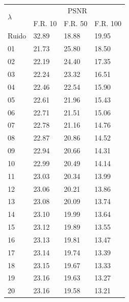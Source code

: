 \documentclass[a4paper]{article}
\begin{document}
\vspace{2em}
\centering 
\begin{tabular}{|l|l|l|l|}
  \hline
  \multirow{2}{*}{$\lambda$} & \multicolumn{3}{|c|}{PSNR} \\
  \cline{2-4}
   & F.R. 10 & F.R. 50 & F.R. 100 \\ \hline

  Ruido	 & 	32.89	 & 	18.88	 & 	19.95 \\
  01	 & 	21.73	 & 	25.80	 & 	18.50 \\
  02	 & 	22.19	 & 	24.40	 & 	17.35 \\
  03	 & 	22.24	 & 	23.32	 & 	16.51 \\
  04	 & 	22.46	 & 	22.54	 & 	15.90 \\
  05	 & 	22.61	 & 	21.96	 & 	15.43 \\
  06	 & 	22.71	 & 	21.51	 & 	15.06 \\
  07	 & 	22.78	 & 	21.16	 & 	14.76 \\
  08	 & 	22.87	 & 	20.86	 & 	14.52 \\
  09	 & 	22.94	 & 	20.66	 & 	14.31 \\
  10	 & 	22.99	 & 	20.49	 & 	14.14 \\
  11	 & 	23.03	 & 	20.34	 & 	13.99 \\
  12	 & 	23.06	 & 	20.21	 & 	13.86 \\
  13	 & 	23.08	 & 	20.09	 & 	13.74 \\
  14	 & 	23.10	 & 	19.99	 & 	13.64 \\
  15	 & 	23.12	 & 	19.89	 & 	13.55 \\
  16	 & 	23.13	 & 	19.81	 & 	13.47 \\
  17	 & 	23.14	 & 	19.74	 & 	13.39 \\
  18	 & 	23.15	 & 	19.67	 & 	13.33 \\
  19	 & 	23.16	 & 	19.63	 & 	13.27 \\
  20	 & 	23.16	 & 	19.58	 & 	13.21 \\
  \hline
\end{tabular}


\newpage
\end{document}
